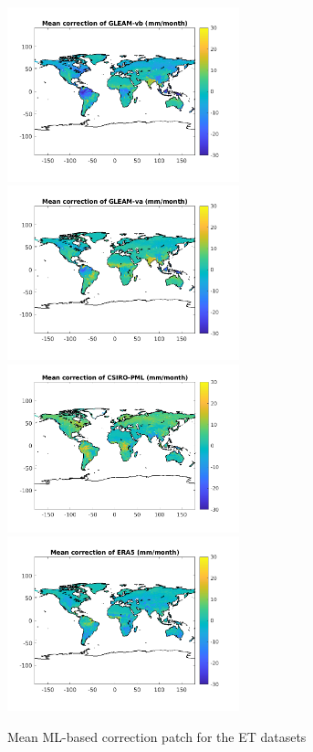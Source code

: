 \documentclass[draft]{agujournal2019}
\begin{document}
\begin{figure}[h]
\includegraphics[width=0.6\textwidth]{patchm1}
\includegraphics[width=0.6\textwidth]{patchm2}
\includegraphics[width=0.6\textwidth]{patchm3}
\includegraphics[width=0.6\textwidth]{patchm4}
\caption{Mean ML-based correction patch for the ET datasets}
\end{figure}
\end{document}
